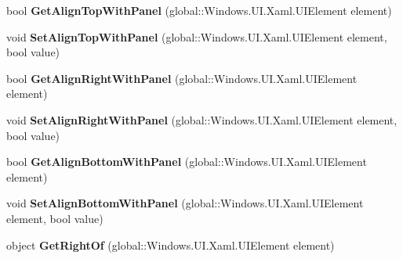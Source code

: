 \begin{DoxyCompactItemize}
bool {\bfseries Get\+Align\+Top\+With\+Panel} (global\+::\+Windows.\+U\+I.\+Xaml.\+U\+I\+Element element)
\item 
\mbox{\label{interface_windows_1_1_u_i_1_1_xaml_1_1_controls_1_1_i_relative_panel_statics_a7980252289e1bd42485241913f9afdad}} 
void {\bfseries Set\+Align\+Top\+With\+Panel} (global\+::\+Windows.\+U\+I.\+Xaml.\+U\+I\+Element element, bool value)
\item 
\mbox{\label{interface_windows_1_1_u_i_1_1_xaml_1_1_controls_1_1_i_relative_panel_statics_a61fabd1c8713c07b5ac48fa9a27f4ae5}} 
bool {\bfseries Get\+Align\+Right\+With\+Panel} (global\+::\+Windows.\+U\+I.\+Xaml.\+U\+I\+Element element)
\item 
\mbox{\label{interface_windows_1_1_u_i_1_1_xaml_1_1_controls_1_1_i_relative_panel_statics_a2c4edfaf4e3bacc3f959ee0a58907e8a}} 
void {\bfseries Set\+Align\+Right\+With\+Panel} (global\+::\+Windows.\+U\+I.\+Xaml.\+U\+I\+Element element, bool value)
\item 
\mbox{\label{interface_windows_1_1_u_i_1_1_xaml_1_1_controls_1_1_i_relative_panel_statics_ae0d4717061b42365289442969aba8977}} 
bool {\bfseries Get\+Align\+Bottom\+With\+Panel} (global\+::\+Windows.\+U\+I.\+Xaml.\+U\+I\+Element element)
\item 
\mbox{\label{interface_windows_1_1_u_i_1_1_xaml_1_1_controls_1_1_i_relative_panel_statics_a0282f7f3fedefd9e7725ff429dfb714b}} 
void {\bfseries Set\+Align\+Bottom\+With\+Panel} (global\+::\+Windows.\+U\+I.\+Xaml.\+U\+I\+Element element, bool value)
\item 
\mbox{\label{interface_windows_1_1_u_i_1_1_xaml_1_1_controls_1_1_i_relative_panel_statics_a9439a2bee522a760bbb857e11546ccbc}} 
object {\bfseries Get\+Right\+Of} (global\+::\+Windows.\+U\+I.\+Xaml.\+U\+I\+Element element)
\item 

\end{DoxyCompactItemize}
